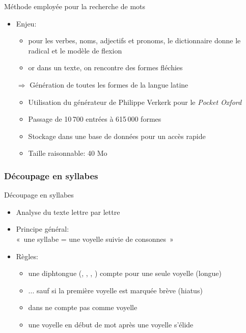 \documentclass{beamer}
\newcommand{\lettre}[1]{\emph{\structure{#1}}}
\begin{document}
\begin{frame}{Méthode employée pour la recherche de mots}

\begin{itemize}

\item Enjeu:

\begin{itemize}
\item pour les verbes, noms, adjectifs et pronoms, le dictionnaire donne le radical et le modèle de flexion
\item or dans un texte, on rencontre des formes fléchies
\end{itemize}

\vfill

\item[$\Rightarrow$] Génération de toutes les formes de la langue latine

\begin{itemize}
\item Utilisation du générateur de Philippe Verkerk pour le \emph{Pocket Oxford}
\item Passage de 10\,700 entrées à 615\,000 formes
\item Stockage dans une base de données pour un accès rapide
\item Taille raisonnable: 40 Mo
\end{itemize}

\end{itemize}

\end{frame} %


\subsubsection{Découpage en syllabes}

\begin{frame}{Découpage en syllabes}

\begin{itemize}
\item Analyse du texte lettre par lettre
\item Principe général:\\ «~une syllabe = une voyelle suivie de consonnes~»
\item Règles:

\begin{itemize}
\item une diphtongue (\lettre{ae}, \lettre{oe}, \lettre{eu}, \lettre{au}) compte pour une seule voyelle (longue)
\item ... sauf si la première voyelle est marquée brève (hiatus)
\item \lettre{u} dans \lettre{qu} ne compte pas comme voyelle
\item une voyelle en début de mot après une voyelle s'élide
\end{itemize}

\end{itemize}
\end{frame} %
\end{document}
